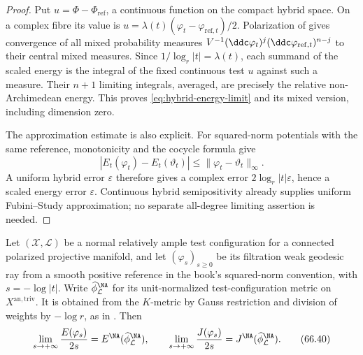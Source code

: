 \begin{proof}
Put $u=\Phi-\Phi_{\mathrm{ref}}$, a continuous function on the compact
hybrid space. On a complex fibre its value is
$u=\lambda(t)(\varphi_t-\varphi_{\mathrm{ref},t})/2$.
Polarization of  gives convergence of all
mixed probability measures $V^{-1}(\ddc\varphi_t)^j
(\ddc\varphi_{\mathrm{ref},t})^{n-j}$ to their central mixed measures.
Since $1/\log_r|t|=\lambda(t)$, each summand of the scaled energy is the
integral of the fixed continuous test $u$ against such a measure.
Their $n+1$ limiting integrals, averaged, are precisely the relative
non-Archimedean energy. This proves \eqref{eq:hybrid-energy-limit} and
its mixed version, including dimension zero.

The approximation estimate is also explicit. For squared-norm potentials
with the same reference, monotonicity and the cocycle formula give
\[
 |E_t(\varphi_t)-E_t(\vartheta_t)|
       \leq\|\varphi_t-\vartheta_t\|_\infty.
\tag{66.39}\label{eq:hybrid-energy-lipschitz}
\]
A uniform hybrid error $\varepsilon$ therefore gives a complex error
$2\log_r|t|\varepsilon$, hence a scaled energy error $\varepsilon$.
Continuous hybrid semipositivity already supplies uniform Fubini--Study
approximation; no separate all-degree limiting assertion is needed.
\end{proof}

\begin{proposition}\label{prop:hybrid-energy-slope}
Let $(\mathcal X,\mathcal L)$ be a normal relatively ample test configuration for a connected polarized projective manifold, and let $(\varphi_s)_{s\geq0}$ be its filtration weak geodesic ray from a smooth positive reference in the book's squared-norm convention, with $s=-\log|t|$. Write $\widehat\phi_{\mathcal L}^{\NA}$ for its unit-normalized test-configuration metric on $X^{\mathrm{an,triv}}$. It is obtained from the $K$-metric by Gauss restriction and division of weights by $-\log r$, as in . Then
\[
       \lim_{s\to+\infty}\frac{E(\varphi_s)}{2s}
             =E^{\NA}(\widehat\phi_{\mathcal L}^{\NA}),
       \qquad
       \lim_{s\to+\infty}\frac{J(\varphi_s)}{2s}
             =J^{\NA}(\widehat\phi_{\mathcal L}^{\NA}).
\tag{66.40}\label{eq:hybrid-ej-slopes}
\]
\end{proposition}

